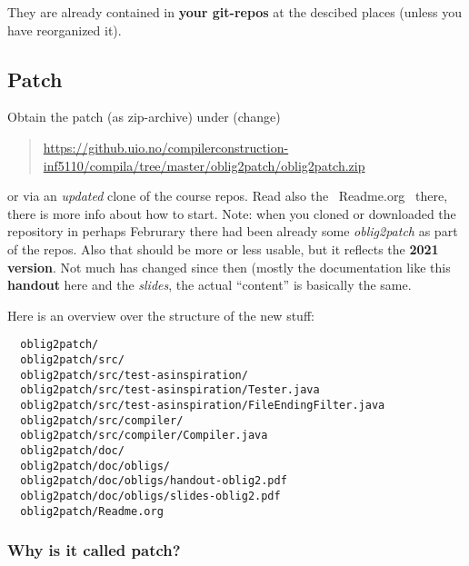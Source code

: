 \documentclass[11pt,freeform]{handout}[2014/08/13]
\begin{document}
They are already contained in \textbf{your git-repos} at the descibed
places (unless you have reorganized it).

\subsection*{Patch}
\label{sec:patch}


Obtain the patch (as zip-archive) under  (change)

\begin{quote}
  \url{https://github.uio.no/compilerconstruction-inf5110/compila/tree/master/oblig2patch/oblig2patch.zip}
\end{quote}

or via an \emph{updated} clone of the course repos. Read also the
~Readme.org~ there, there is more info about how to start. Note: when you
cloned or downloaded the repository in perhaps Februrary there had been
already some \emph{oblig2patch} as part of the repos. Also that should be
more or less usable, but it reflects the \textbf{2021 version}. Not much
has changed since then (mostly the documentation like this \textbf{handout}
here and the \emph{slides}, the actual ``content'' is basically the same.

Here is an overview over the structure of the new stuff:


\begin{verbatim}
  oblig2patch/
  oblig2patch/src/
  oblig2patch/src/test-asinspiration/
  oblig2patch/src/test-asinspiration/Tester.java
  oblig2patch/src/test-asinspiration/FileEndingFilter.java
  oblig2patch/src/compiler/
  oblig2patch/src/compiler/Compiler.java
  oblig2patch/doc/
  oblig2patch/doc/obligs/
  oblig2patch/doc/obligs/handout-oblig2.pdf
  oblig2patch/doc/obligs/slides-oblig2.pdf
  oblig2patch/Readme.org
\end{verbatim}


\subsubsection{Why is it called patch?}
\label{sec:why-it-called}
\end{document}
